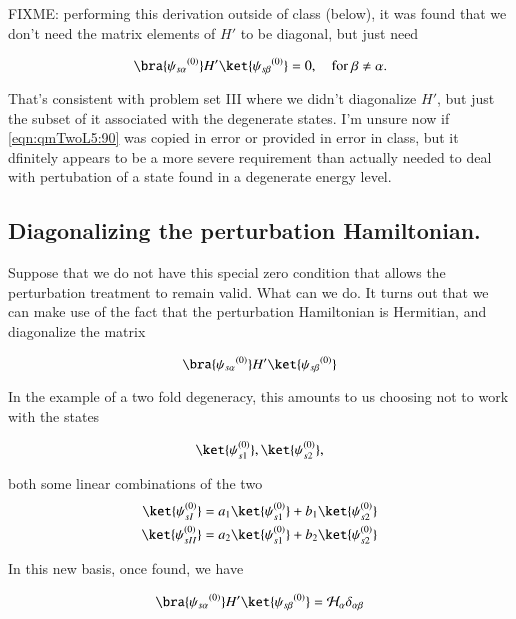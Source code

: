 FIXME: performing this derivation outside of class (below), it was found that we don't need the matrix elements of $H'$ to be diagonal, but just need

\begin{equation}\label{eqn:qmTwoL5:90b}
\bra{{\psi_{s \alpha}}^{(0)}} H' \ket{{\psi_{s \beta}}^{(0)}} = 0, \quad \mbox{for $\beta \ne \alpha$}.
\end{equation}

That's consistent with problem set III where we didn't diagonalize $H'$, but just the subset of it associated with the degenerate states.  I'm unsure now if \ref{eqn:qmTwoL5:90} was copied in error or provided in error in class, but it dfinitely appears to be a more severe requirement than actually needed to deal with pertubation of a state found in a degenerate energy level.



\subsection{Diagonalizing the perturbation Hamiltonian.}

Suppose that we do not have this special zero condition that allows the perturbation treatment to remain valid.  What can we do.  It turns out that we can make use of the fact that the perturbation Hamiltonian is Hermitian, and diagonalize the matrix

\begin{equation}\label{eqn:qmTwoL5:110}
\bra{{\psi_{s \alpha}}^{(0)}} H' \ket{{\psi_{s \beta}}^{(0)}} 
\end{equation}

In the example of a two fold degeneracy, this amounts to us choosing not to work with the states

\begin{equation}\label{eqn:qmTwoL5:130}
\ket{\psi_{s1}^{(0)}}, \ket{\psi_{s2}^{(0)}},
\end{equation}

both some linear combinations of the two
\begin{align}\label{eqn:qmTwoL5:150}
\ket{\psi_{sI}^{(0)}} &= a_1 \ket{\psi_{s1}^{(0)}} + b_1 \ket{\psi_{s2}^{(0)}} \\
\ket{\psi_{sII}^{(0)}} &= a_2 \ket{\psi_{s1}^{(0)}} + b_2 \ket{\psi_{s2}^{(0)}} 
\end{align}

In this new basis, once found, we have

\begin{equation}\label{eqn:qmTwoL5:170}
\bra{{\psi_{s \alpha}}^{(0)}} H' \ket{{\psi_{s \beta}}^{(0)}} = \mathcal{H}_\alpha \delta_{\alpha \beta}
\end{equation}

